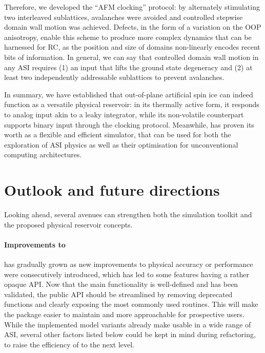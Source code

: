 Therefore, we developed the ``AFM clocking'' protocol: by alternately stimulating two interleaved sublattices, avalanches were avoided and controlled stepwise domain wall motion was achieved.
Defects, in the form of a variation on the OOP anisotropy, enable this scheme to produce more complex dynamics that can be harnessed for RC, as the position and size of domains non-linearly encodes recent bits of information.
In general, we can say that controlled domain wall motion in any ASI requires (1) an input that lifts the ground state degeneracy and (2) at least two independently addressable sublattices to prevent avalanches. \\\par

In summary, we have established that out-of-plane artificial spin ice can indeed function as a versatile physical reservoir: in its thermally active form, it responds to analog input akin to a leaky integrator, while its non-volatile counterpart supports binary input through the clocking protocol. %
Meanwhile, \hotspice has proven its worth as a flexible and efficient simulator, that can be used for both the exploration of ASI physics as well as their optimisation for unconventional computing architectures.

\newpage
\section{Outlook and future directions}
Looking ahead, several avenues can strengthen both the \hotspice simulation toolkit and the proposed physical reservoir concepts.

\paragraph{Improvements to \hotspice}
\hotspice has gradually grown as new improvements to physical accuracy or performance were consecutively introduced, which has led to some features having a rather opaque API.
Now that the main functionality is well-defined and has been validated, the public API should be streamlined by removing deprecated functions and clearly exposing the most commonly used routines. %
This will make the package easier to maintain and more approachable for prospective users.
While the implemented model variants already make \hotspice usable in a wide range of ASI, several other factors listed below could be kept in mind during refactoring, to raise the efficiency of \hotspice to the next level. \\\par

